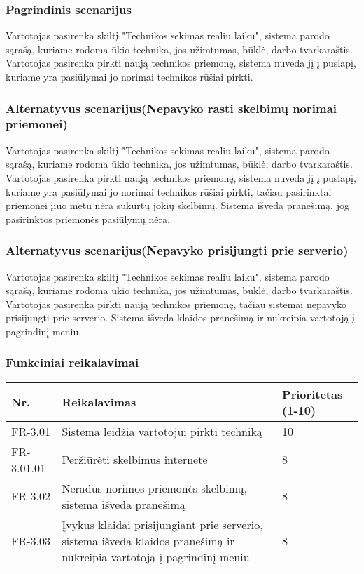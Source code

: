 \documentclass[oneside]{VUMIFPSkursinis}
\begin{document}
\subsubsection{Pagrindinis scenarijus}
	Vartotojas pasirenka skiltį "Technikos sekimas realiu laiku", sistema parodo sąrašą, kuriame rodoma ūkio technika, jos užimtumas, būklė, darbo tvarkaraštis. Vartotojas pasirenka pirkti naują technikos priemonę, sistema nuveda jį į puslapį, kuriame yra pasiūlymai jo norimai technikos rūšiai pirkti.
\subsubsection{Alternatyvus scenarijus(Nepavyko rasti skelbimų norimai priemonei)}
	Vartotojas pasirenka skiltį "Technikos sekimas realiu laiku", sistema parodo sąrašą, kuriame rodoma ūkio technika, jos užimtumas, būklė, darbo tvarkaraštis. Vartotojas pasirenka pirkti naują technikos priemonę, sistema nuveda jį į puslapį, kuriame yra pasiūlymai jo norimai technikos rūšiai pirkti, tačiau pasirinktai priemonei įiuo metu nėra sukurtų jokių skelbimų. Sistema išveda pranešimą, jog pasirinktos priemonės pasiūlymų nėra.
\subsubsection{Alternatyvus scenarijus(Nepavyko prisijungti prie serverio)}
	Vartotojas pasirenka skiltį "Technikos sekimas realiu laiku", sistema parodo sąrašą, kuriame rodoma ūkio technika, jos užimtumas, būklė, darbo tvarkaraštis. Vartotojas pasirenka pirkti naują technikos priemonę, tačiau sistemai nepavyko prisijungti prie serverio. Sistema išveda klaidos pranešimą ir nukreipia vartotoją į pagrindinį meniu.
\subsubsection{Funkciniai reikalavimai}
\begin{table}[htbp]
	\begin{tabularx}{1\textwidth}{ |P{2.5cm}|X|P{3cm }| }  \hline
           	Nr. & Reikalavimas &  Prioritetas (1-10)  \\   \hline 
         		FR-3.01 & Sistema leidžia vartotojui pirkti techniką & 10  \\   \hline
		FR-3.01.01 & Peržiūrėti skelbimus internete & 8 \\ \hline
        		FR-3.02 & Neradus norimos priemonės skelbimų, sistema išveda pranešimą & 8   \\   \hline
			FR-3.03 & Įvykus klaidai prisijungiant prie serverio, sistema išveda klaidos pranešimą ir nukreipia vartotoją į pagrindinį meniu & 8 \\ \hline
	\end{tabularx}
\end{table}
\end{document}

